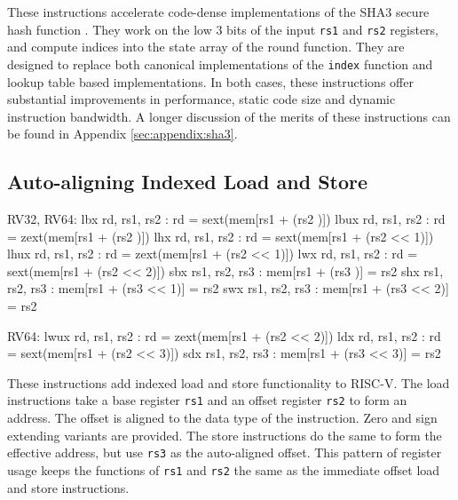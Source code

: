 These instructions accelerate code-dense implementations of the SHA3 secure
hash function \cite{nist:fips:202}.
They work on the low $3$ bits of the input {\tt rs1} and {\tt rs2} registers,
and compute indices into the state array of the round function.
They are designed to replace both canonical implementations of the
{\tt index} function and lookup table based implementations.
In both cases, these instructions offer substantial
improvements in performance, static code size and dynamic instruction
bandwidth.
A longer discussion of the merits of these instructions can
be found in Appendix \ref{sec:appendix:sha3}.




\subsection{Auto-aligning Indexed Load and Store}
\label{sec:ildst}

\begin{cryptoisa}
RV32, RV64:
    lbx     rd,  rs1, rs2 : rd = sext(mem[rs1 + (rs2     )])
    lbux    rd,  rs1, rs2 : rd = zext(mem[rs1 + (rs2     )])
    lhx     rd,  rs1, rs2 : rd = sext(mem[rs1 + (rs2 << 1)])
    lhux    rd,  rs1, rs2 : rd = zext(mem[rs1 + (rs2 << 1)])
    lwx     rd,  rs1, rs2 : rd = sext(mem[rs1 + (rs2 << 2)])
    sbx     rs1, rs2, rs3 : mem[rs1 + (rs3     )] = rs2
    shx     rs1, rs2, rs3 : mem[rs1 + (rs3 << 1)] = rs2
    swx     rs1, rs2, rs3 : mem[rs1 + (rs3 << 2)] = rs2

RV64:
    lwux    rd,  rs1, rs2 : rd = zext(mem[rs1 + (rs2 << 2)])
    ldx     rd,  rs1, rs2 : rd = sext(mem[rs1 + (rs2 << 3)])
    sdx     rs1, rs2, rs3 : mem[rs1 + (rs3 << 3)] = rs2
\end{cryptoisa}


These instructions add indexed load and store functionality to RISC-V.
The load instructions take a base register {\tt rs1} and an offset
register {\tt rs2} to form an address.
The offset is aligned to the data type of the instruction.
Zero and sign extending variants are provided.
The store instructions do the same to form the effective address, but
use {\tt rs3} as the auto-aligned offset.
This pattern of register usage keeps the functions of {\tt rs1} and
{\tt rs2} the same as the immediate offset load and store instructions.

